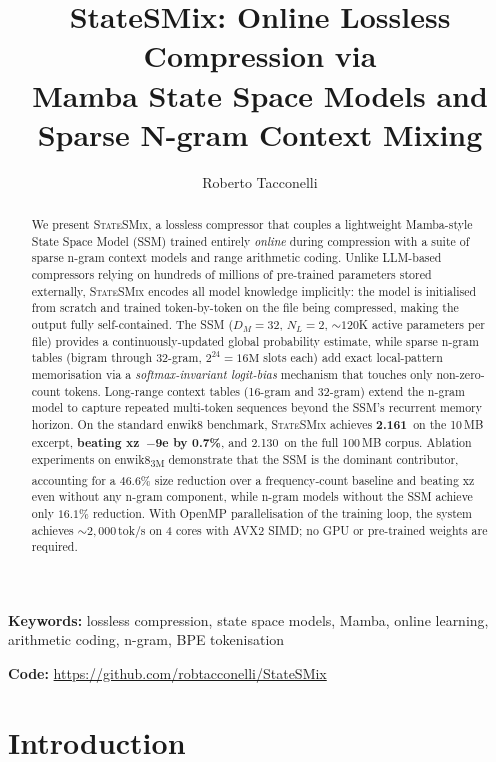 \documentclass[10pt,twocolumn]{article}
\title{\textbf{StateSMix: Online Lossless Compression via\\
Mamba State Space Models and\\Sparse N-gram Context Mixing}}
\author[1]{Roberto Tacconelli}
\affil[1]{Independent Researcher\\
\texttt{tacconelli.rob@gmail.com}}
\date{}
\newcommand{\ssmcomp}{\textsc{StateSMix}}
\newcommand{\bpb}{\text{bpb}}
\begin{document}
\maketitle
\thispagestyle{empty}

\begin{abstract}
We present \ssmcomp{}, a lossless compressor that couples a lightweight
Mamba-style State Space Model (SSM) trained entirely \emph{online} during
compression with a suite of sparse n-gram context models and range
arithmetic coding.
Unlike LLM-based compressors relying on hundreds of millions of
pre-trained parameters stored externally, \ssmcomp{} encodes all model
knowledge implicitly: the model is initialised from scratch and trained
token-by-token on the file being compressed, making the output fully
self-contained.
The SSM ($D_M=32$, $N_L=2$, ${\sim}120$K active parameters per file)
provides a continuously-updated global probability estimate, while
sparse n-gram tables (bigram through 32-gram, $2^{24}=16\text{M}$ slots
each) add exact local-pattern memorisation via a
\emph{softmax-invariant logit-bias} mechanism that touches only
non-zero-count tokens.  Long-range context tables (16-gram and 32-gram)
extend the n-gram model to capture repeated multi-token sequences
beyond the SSM's recurrent memory horizon.
On the standard enwik8 benchmark, \ssmcomp{} achieves
\textbf{2.161\,\bpb{}} on the 10\,MB excerpt,
\textbf{beating xz~$-$9e by 0.7\%}, and 2.130\,\bpb{} on the full
100\,MB corpus.
Ablation experiments on enwik8\textsubscript{3M} demonstrate that the
SSM is the dominant contributor, accounting for a $46.6\%$ size reduction
over a frequency-count baseline and beating xz even without any n-gram
component, while n-gram models without the SSM achieve only $16.1\%$
reduction.
With OpenMP parallelisation of the training loop, the system achieves
${\sim}2{,}000$\,tok/s on 4 cores with AVX2 SIMD; no GPU or
pre-trained weights are required.
\end{abstract}

\medskip
\noindent\textbf{Keywords:} lossless compression, state space models,
Mamba, online learning, arithmetic coding, n-gram, BPE tokenisation

\medskip
\noindent\textbf{Code:} \url{https://github.com/robtacconelli/StateSMix}

\section{Introduction}
\label{sec:intro}
\end{document}
